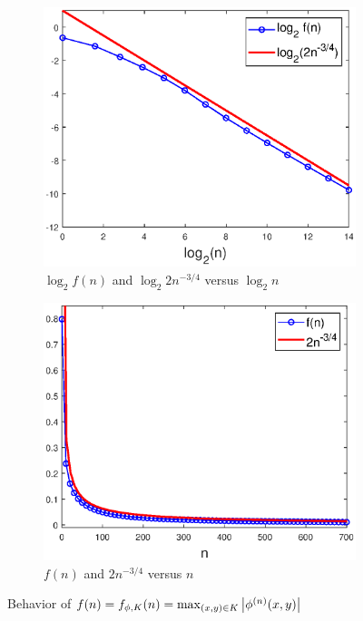 \documentclass[smallextended]{svjour3}
\theoremstyle{remark}
\begin{document}
\begin{example}
\begin{figure}[!htb]
    \begin{subfigure}{0.49\textwidth}
    \centering
    \includegraphics[scale=0.4]{Fig7a.eps}
    \caption{$\log_2 f(n)$ and  $\log_2 2n^{-3/4}$ versus $\log_2 n$}
    \end{subfigure}
    \begin{subfigure}{0.49\textwidth}
    \centering
    \includegraphics[scale=0.4]{Fig7b.eps}
    \caption{$f(n)$ and $2n^{-3/4}$ versus $n$}
    \end{subfigure}
    \caption{Behavior of $f(n)=f_{\phi,K}(n)=\max_{(x,y)\in K}\abs{\phi^{(n)}(x,y)}$}
    \label{fig:Conv_Pwr_2}
\end{figure}


\end{example}
\end{document}
